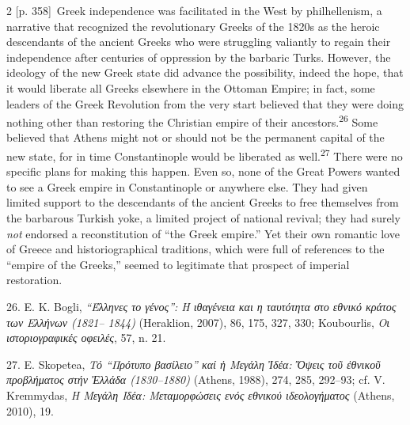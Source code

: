 \documentclass[10pt,a4paper]{article}
\begin{document}
\begin{paracol}{2}
\switchcolumn
{\scriptsize\color{gray}[p. 358]}\ Greek independence was facilitated in the West by philhellenism, a narrative that recognized the revolutionary Greeks of the 1820s as the heroic descendants of the ancient Greeks who were struggling valiantly to regain their independence after centuries of oppression by the barbaric Turks. However, the ideology of the new Greek state did advance the possibility, indeed the hope, that it would liberate all Greeks elsewhere in the Ottoman Empire; in fact, some leaders of the Greek Revolution from the very start believed that they were doing nothing other than restoring the Christian empire of their ancestors.\nobreak\textsuperscript{26} Some believed that Athens might not or should not be the permanent capital of the new state, for in time Constantinople would be liberated as well.\nobreak\textsuperscript{27} There were no specific plans for making this happen. Even so, none of the Great Powers wanted to see a Greek empire in Constantinople or anywhere else. They had given limited support to the descendants of the ancient Greeks to free themselves from the barbarous Turkish yoke, a limited project of national revival; they had surely \textit{not} endorsed a reconstitution of “the Greek empire.” Yet their own romantic love of Greece and historiographical traditions, which were full of references to the “empire of the Greeks,” seemed to legitimate that prospect of imperial restoration.\par{\small 26. E. K. Bogli, \textit{“Έλληνες το γένος”: Η ιθαγένεια και η ταυτότητα στο εθνικό κράτος των Ελλήνων (1821– 1844)} (Heraklion, 2007), 86, 175, 327, 330; Koubourlis, \textit{Οι ιστοριογραφικές οφειλές}, 57, n. 21.\par}{\small 27. E. Skopetea, \textit{Τό “Πρότυπο βασίλειο” καί ἡ Μεγάλη Ἰδέα: Ὄψεις τοῦ ἐθνικοῦ προβλήματος στήν Ἐλλάδα (1830–1880)} (Athens, 1988), 274, 285, 292–93; cf. V. Kremmydas, \textit{Η Μεγάλη Ιδέα: Μεταμορφώσεις ενός εθνικού ιδεολογήματος} (Athens, 2010), 19.\par}
\switchcolumn*

\end{paracol}
\end{document}
